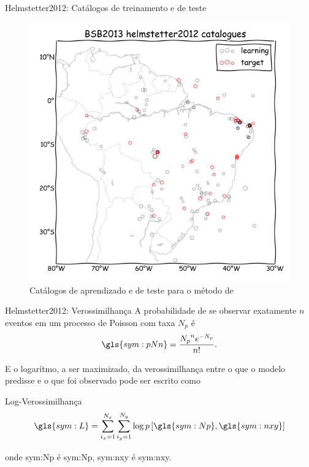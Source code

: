 \documentclass[ucs,8pt]{beamer}
\begin{document}
\begin{frame}{Helmstetter2012: Catálogos de treinamento e de teste}
\begin{figure}[H]
  \centering
  \includegraphics[height=.90\textheight]{helmstetter_catalogues} 
  \caption{Catálogos de aprendizado e de teste para o método de \citet{helmstetter_2012}}
  \label{fig:h_catalogue} 
\end{figure}
\end{frame}


\begin{frame}{Helmstetter2012: Verossimilhança}
	A probabilidade de se observar exatamente $n$ eventos em um processo de Poisson
	com taxa $N_p$ é
		\begin{equation}
			\ensuremath{
				\gls{sym:pNn} = \frac{{N_p}^n e^{-N_p}}{n!}.
			}
			\label{eq:loglik}
		\end{equation}

	\vspace{0.5cm}
	E o logarítmo, a ser maximizado, da verossimilhança entre 
	o que o modelo predisse e o que foi observado 
	pode ser escrito como
	\begin{block}{Log-Verossimilhança}
		\begin{equation}
			\ensuremath{
				\gls{sym:L} = \sum_{i_x=1}^{N_x}\sum_{i_y=1}^{N_y}\log p\left[  \gls{sym:Np}, \gls{sym:nxy}  \right]
			}
			\label{eq:loglik}
		\end{equation}
	\end{block}
	onde \gls{sym:Np} é \glsdesc{sym:Np},
		\gls{sym:nxy} é \glsdesc{sym:nxy}.
\end{frame}
\end{document}
